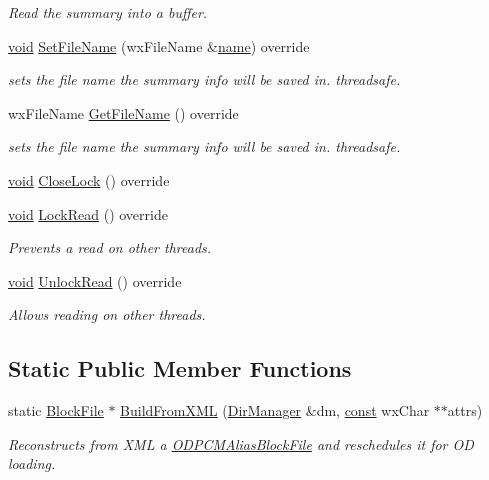 \begin{DoxyCompactItemize}
\begin{DoxyCompactList}\small\item\em Read the summary into a buffer. \end{DoxyCompactList}\item 
\hyperlink{sound_8c_ae35f5844602719cf66324f4de2a658b3}{void} \hyperlink{class_o_d_p_c_m_alias_block_file_ab34483f6450bf17d5f3ff0d97adc7915}{Set\+File\+Name} (wx\+File\+Name \&\hyperlink{lib_2expat_8h_a1b49b495b59f9e73205b69ad1a2965b0}{name}) override
\begin{DoxyCompactList}\small\item\em sets the file name the summary info will be saved in. threadsafe. \end{DoxyCompactList}\item 
wx\+File\+Name \hyperlink{class_o_d_p_c_m_alias_block_file_a6f5c7b27e19ac3f4734fa67cd8425ddd}{Get\+File\+Name} () override
\begin{DoxyCompactList}\small\item\em sets the file name the summary info will be saved in. threadsafe. \end{DoxyCompactList}\item 
\hyperlink{sound_8c_ae35f5844602719cf66324f4de2a658b3}{void} \hyperlink{class_o_d_p_c_m_alias_block_file_a24fc4b6e1e0200e23d1ba746d1f666f2}{Close\+Lock} () override
\item 
\hyperlink{sound_8c_ae35f5844602719cf66324f4de2a658b3}{void} \hyperlink{class_o_d_p_c_m_alias_block_file_a4a88dd841ed537ddccd37d503b2642a6}{Lock\+Read} () override
\begin{DoxyCompactList}\small\item\em Prevents a read on other threads. \end{DoxyCompactList}\item 
\hyperlink{sound_8c_ae35f5844602719cf66324f4de2a658b3}{void} \hyperlink{class_o_d_p_c_m_alias_block_file_a1165611735ce562282971dada1623f85}{Unlock\+Read} () override
\begin{DoxyCompactList}\small\item\em Allows reading on other threads. \end{DoxyCompactList}\end{DoxyCompactItemize}
\subsection*{Static Public Member Functions}
\begin{DoxyCompactItemize}
\item 
static \hyperlink{class_block_file}{Block\+File} $\ast$ \hyperlink{class_o_d_p_c_m_alias_block_file_ab73f4756dd8d977510a3ab15f909a996}{Build\+From\+X\+ML} (\hyperlink{class_dir_manager}{Dir\+Manager} \&dm, \hyperlink{getopt1_8c_a2c212835823e3c54a8ab6d95c652660e}{const} wx\+Char $\ast$$\ast$attrs)
\begin{DoxyCompactList}\small\item\em Reconstructs from X\+ML a \hyperlink{class_o_d_p_c_m_alias_block_file}{O\+D\+P\+C\+M\+Alias\+Block\+File} and reschedules it for OD loading. \end{DoxyCompactList}\end{DoxyCompactItemize}
